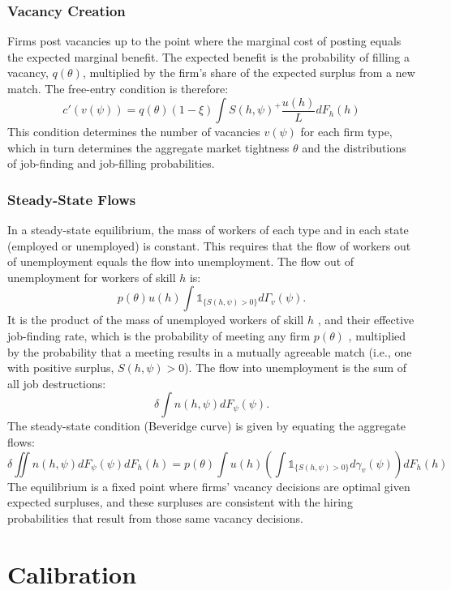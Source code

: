 \documentclass[
  11pt,
  letterpaper,
  DIV=11,
  numbers=noendperiod]{scrartcl}
\begin{document}
\subsubsection{Vacancy Creation}\label{vacancy-creation}

Firms post vacancies up to the point where the marginal cost of posting
equals the expected marginal benefit. The expected benefit is the
probability of filling a vacancy, \(q(\theta)\), multiplied by the
firm's share of the expected surplus from a new match. The free-entry
condition is therefore:
\[c'(v(\psi)) = q(\theta) (1-\xi) \int S(h, \psi)^+ \frac{u(h)}{L} dF_h(h)\]
This condition determines the number of vacancies \(v(\psi)\) for each
firm type, which in turn determines the aggregate market tightness
\(\theta\) and the distributions of job-finding and job-filling
probabilities.

\subsubsection{Steady-State Flows}\label{steady-state-flows}

In a steady-state equilibrium, the mass of workers of each type and in
each state (employed or unemployed) is constant. This requires that the
flow of workers out of unemployment equals the flow into unemployment.
The flow out of unemployment for workers of skill \(h\) is:
\[p(\theta) u(h) \int \mathbb{1}_{\{S(h, \psi) > 0\}} d\Gamma_v(\psi).\]It
is the product of the mass of unemployed workers of skill \(h\) , and
their effective job-finding rate, which is the probability of meeting
any firm \(p(\theta)\) , multiplied by the probability that a meeting
results in a mutually agreeable match (i.e., one with positive surplus,
\(S(h, \psi)>0\)). The flow into unemployment is the sum of all job
destructions: \[\delta \int n(h, \psi) dF_\psi(\psi).\] The steady-state
condition (Beveridge curve) is given by equating the aggregate flows:
\[\delta \iint n(h, \psi) dF_\psi(\psi) dF_h(h) = p(\theta) \int u(h) \left( \int \mathbb{1}_{\{S(h, \psi) > 0\}} d\gamma_v(\psi) \right) dF_h(h)\]
The equilibrium is a fixed point where firms' vacancy decisions are
optimal given expected surpluses, and these surpluses are consistent
with the hiring probabilities that result from those same vacancy
decisions.

\section{Calibration}\label{calibration}
\end{document}
